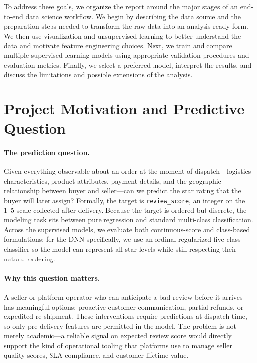 \documentclass[11pt]{article}
\begin{document}
To address these goals, we organize the report around the major stages of an end-to-end data science workflow. We begin by describing the data source and the preparation steps needed to transform the raw data into an analysis-ready form. We then use visualization and unsupervised learning to better understand the data and motivate feature engineering choices. Next, we train and compare multiple supervised learning models using appropriate validation procedures and evaluation metrics. Finally, we select a preferred model, interpret the results, and discuss the limitations and possible extensions of the analysis.

\section{Project Motivation and Predictive Question}

\paragraph{The prediction question.}
Given everything observable about an order at the moment of dispatch---logistics characteristics, product attributes, payment details, and the geographic relationship between buyer and seller---can we predict the star rating that the buyer will later assign?
Formally, the target is \texttt{review\_score}, an integer on the 1--5 scale collected after delivery.
Because the target is ordered but discrete, the modeling task sits between pure regression and standard multi-class classification. Across the supervised models, we evaluate both continuous-score and class-based formulations; for the DNN specifically, we use an ordinal-regularized five-class classifier so the model can represent all star levels while still respecting their natural ordering.

\paragraph{Why this question matters.}
A seller or platform operator who can anticipate a bad review before it arrives has meaningful options: proactive customer communication, partial refunds, or expedited re-shipment.
These interventions require predictions at dispatch time, so only pre-delivery features are permitted in the model.
The problem is not merely academic---a reliable signal on expected review score would directly support the kind of operational tooling that platforms use to manage seller quality scores, SLA compliance, and customer lifetime value.
\end{document}
